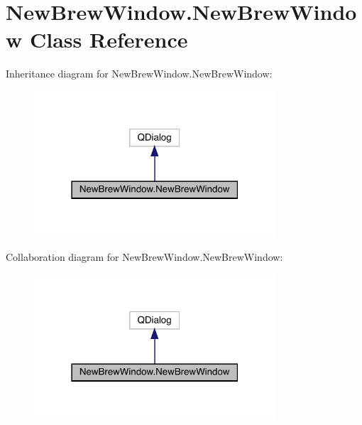 \hypertarget{class_new_brew_window_1_1_new_brew_window}{}\section{New\+Brew\+Window.\+New\+Brew\+Window Class Reference}
\label{class_new_brew_window_1_1_new_brew_window}


Inheritance diagram for New\+Brew\+Window.\+New\+Brew\+Window\+:\nopagebreak
\begin{figure}[H]
\begin{center}
\leavevmode
\includegraphics[width=255pt]{class_new_brew_window_1_1_new_brew_window__inherit__graph}
\end{center}
\end{figure}


Collaboration diagram for New\+Brew\+Window.\+New\+Brew\+Window\+:\nopagebreak
\begin{figure}[H]
\begin{center}
\leavevmode
\includegraphics[width=255pt]{class_new_brew_window_1_1_new_brew_window__coll__graph}
\end{center}
\end{figure}
